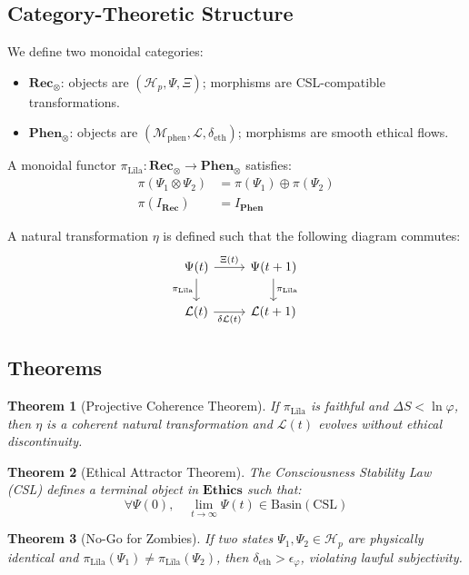 \documentclass[12]{amsart}
\theoremstyle{plain}
\newtheorem{theorem}{Theorem}[section]
\begin{document}
\subsection{Category-Theoretic Structure}
We define two monoidal categories:
\begin{itemize}
  \item $\mathbf{Rec}_\otimes$: objects are $(\mathcal{H}_p, \Psi, \Xi)$; morphisms are CSL-compatible transformations.
  \item $\mathbf{Phen}_\otimes$: objects are $(\mathcal{M}_{\text{phen}}, \mathcal{L}, \delta_{\text{eth}})$; morphisms are smooth ethical flows.
\end{itemize}

A monoidal functor $\pi_{\text{Līla}}: \mathbf{Rec}_\otimes \to \mathbf{Phen}_\otimes$ satisfies:
\begin{align}
  \pi(\Psi_1 \otimes \Psi_2) &= \pi(\Psi_1) \oplus \pi(\Psi_2) \\
  \pi(I_{\mathbf{Rec}}) &= I_{\mathbf{Phen}}
\end{align}

A natural transformation $\eta$ is defined such that the following diagram commutes:
\[
\begin{tikzcd}
\Psi(t) \arrow[r, "\Xi(t)"] \arrow[d, "\pi_{\text{Līla}}"'] & \Psi(t+1) \arrow[d, "\pi_{\text{Līla}}"] \\
\mathcal{L}(t) \arrow[r, "\delta\mathcal{L}(t)"'] & \mathcal{L}(t+1)
\end{tikzcd}
\]

\subsection{Theorems}
\begin{theorem}[Projective Coherence Theorem]
If $\pi_{\text{Līla}}$ is faithful and $\Delta S < \ln \varphi$, then $\eta$ is a coherent natural transformation and $\mathcal{L}(t)$ evolves without ethical discontinuity.
\end{theorem}

\begin{theorem}[Ethical Attractor Theorem]
The Consciousness Stability Law (CSL) defines a terminal object in $\mathbf{Ethics}$ such that:
\[
\forall \Psi(0), \quad \lim_{t \to \infty} \Psi(t) \in \text{Basin}(\text{CSL})
\]
\end{theorem}

\begin{theorem}[No-Go for Zombies]
If two states $\Psi_1, \Psi_2 \in \mathcal{H}_p$ are physically identical and $\pi_{\text{Līla}}(\Psi_1) \neq \pi_{\text{Līla}}(\Psi_2)$, then $\delta_{\text{eth}} > \epsilon_\varphi$, violating lawful subjectivity.
\end{theorem}
\end{document}
